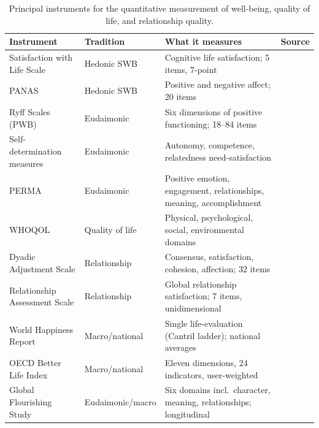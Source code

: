 \begin{table}[t]
\centering
\small
\renewcommand{\arraystretch}{1.25}
\caption{Principal instruments for the quantitative measurement of well-being, quality of life, and relationship quality.}
\label{p11:tab:instruments}
\begin{tabularx}{\linewidth}{@{}>{\raggedright\arraybackslash}p{3.0cm} >{\raggedright\arraybackslash}p{2.4cm} >{\raggedright\arraybackslash}X >{\raggedright\arraybackslash}p{2.2cm}@{}}
\toprule
\rowcolor{pageblush}
\textbf{\textcolor{rosedeep}{Instrument}} & \textbf{\textcolor{rosedeep}{Tradition}} & \textbf{\textcolor{rosedeep}{What it measures}} & \textbf{\textcolor{rosedeep}{Source}} \\
\midrule
Satisfaction with Life Scale & Hedonic SWB & Cognitive life satisfaction; 5 items, 7-point & \textcite{diener1985} \\
PANAS & Hedonic SWB & Positive and negative affect; 20 items & \textcite{watson1988} \\
Ryff Scales (PWB) & Eudaimonic & Six dimensions of positive functioning; 18--84 items & \textcite{ryff1989,ryffkeyes1995} \\
Self-determination measures & Eudaimonic & Autonomy, competence, relatedness need-satisfaction & \textcite{ryan2000} \\
PERMA & Eudaimonic & Positive emotion, engagement, relationships, meaning, accomplishment & \textcite{seligman2011} \\
WHOQOL & Quality of life & Physical, psychological, social, environmental domains & \textcite{whoqol1998} \\
Dyadic Adjustment Scale & Relationship & Consensus, satisfaction, cohesion, affection; 32 items & \textcite{spanier1976} \\
Relationship Assessment Scale & Relationship & Global relationship satisfaction; 7 items, unidimensional & \textcite{hendrick1988} \\
World Happiness Report & Macro/national & Single life-evaluation (Cantril ladder); national averages & \textcite{whr2026} \\
OECD Better Life Index & Macro/national & Eleven dimensions, 24 indicators, user-weighted & \textcite{oecdbli} \\
Global Flourishing Study & Eudaimonic/macro & Six domains incl.\ character, meaning, relationships; longitudinal & \textcite{vanderweele2025gfs} \\
\bottomrule
\end{tabularx}
\end{table}

